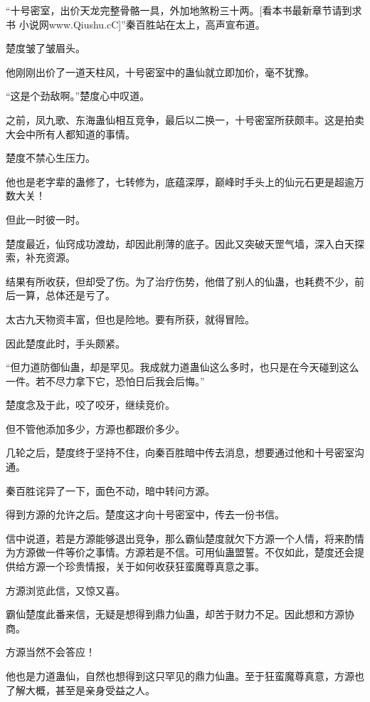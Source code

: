 
\begin{this_body}

“十号密室，出价天龙完整骨骼一具，外加地煞粉三十两。[看本书最新章节请到求书 小说网www.Qiushu.cC]”秦百胜站在太上，高声宣布道。

楚度皱了皱眉头。

他刚刚出价了一道天柱风，十号密室中的蛊仙就立即加价，毫不犹豫。

“这是个劲敌啊。”楚度心中叹道。

之前，凤九歌、东海蛊仙相互竞争，最后以二换一，十号密室所获颇丰。这是拍卖大会中所有人都知道的事情。

楚度不禁心生压力。

他也是老字辈的蛊修了，七转修为，底蕴深厚，巅峰时手头上的仙元石更是超逾万数大关！

但此一时彼一时。

楚度最近，仙窍成功渡劫，却因此削薄的底子。因此又突破天罡气墙，深入白天探索，补充资源。

结果有所收获，但却受了伤。为了治疗伤势，他借了别人的仙蛊，也耗费不少，前后一算，总体还是亏了。

太古九天物资丰富，但也是险地。要有所获，就得冒险。

因此楚度此时，手头颇紧。

“但力道防御仙蛊，却是罕见。我成就力道蛊仙这么多时，也只是在今天碰到这么一件。若不尽力拿下它，恐怕日后我会后悔。”

楚度念及于此，咬了咬牙，继续竞价。

但不管他添加多少，方源也都跟价多少。

几轮之后，楚度终于坚持不住，向秦百胜暗中传去消息，想要通过他和十号密室沟通。

秦百胜诧异了一下，面色不动，暗中转问方源。

得到方源的允许之后。楚度这才向十号密室中，传去一份书信。

信中说道，若是方源能够退出竞争，那么霸仙楚度就欠下方源一个人情，将来酌情为方源做一件等价之事情。方源若是不信。可用仙蛊盟誓。不仅如此，楚度还会提供给方源一个珍贵情报，关于如何收获狂蛮魔尊真意之事。

方源浏览此信，又惊又喜。

霸仙楚度此番来信，无疑是想得到鼎力仙蛊，却苦于财力不足。因此想和方源协商。

方源当然不会答应！

他也是力道蛊仙，自然也想得到这只罕见的鼎力仙蛊。至于狂蛮魔尊真意，方源也了解大概，甚至是亲身受益之人。


\end{this_body}
